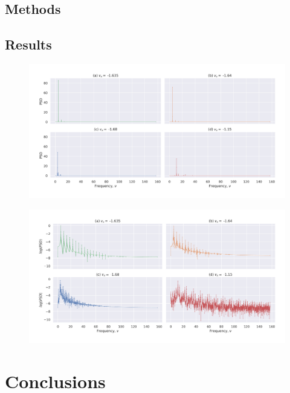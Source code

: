 \documentclass[a4paper]{article}
\begin{document}
	
		\subsection{Methods} \label{methods2}
	
		
		\subsection{Results} \label{results2}
		
		\begin{figure} [h]
			\includegraphics[width=\columnwidth]{../task2/plots/q1-5_lin.jpg}
			\caption{}
			\label{fig:task2_lin}
		\end{figure}
		
		\begin{figure} [h]
			\includegraphics[width=\columnwidth]{../task2/plots/q1-5_log.jpg}
		\end{figure}
	
	
	
	\section{Conclusions} \label{conclusions}
	
	
\end{document}
